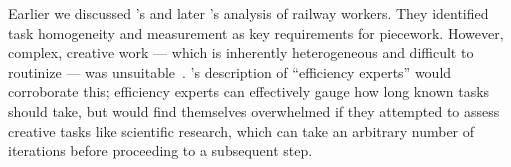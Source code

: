 \documentclass[trackingWork]{subfiles}
\begin{document}
Earlier we discussed \citeauthor{10.2307/23702539}'s and later \citeauthor{Brown01041990}'s analysis of railway workers.
They identified task homogeneity and measurement as key requirements for piecework.
However, complex, creative work
--- which is inherently heterogeneous and difficult to routinize ---
was unsuitable~\cite{10.2307/23702539}.
\citeauthor{Brown01041990}'s description of ``efficiency experts'' would corroborate this;
efficiency experts can effectively gauge how long known tasks should take, but
would find themselves overwhelmed if they attempted to assess creative tasks like scientific research,
which can take an arbitrary number of iterations before proceeding to a subsequent step.






\end{document}

